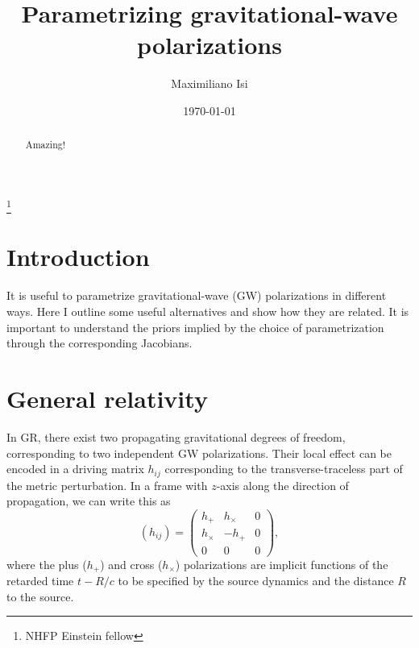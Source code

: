 \documentclass[aps,prd,twocolumn,superscriptaddress,preprintnumbers,floatfix,nofootinbib]{revtex4-2}
\newcommand{\beq}{\begin{equation}}
\newcommand{\eeq}{\end{equation}}
\newcommand{\dcc}{LIGO-PXXXXXXX}
\begin{document}

\title{Parametrizing gravitational-wave polarizations}

\author{Maximiliano Isi}
\thanks{NHFP Einstein fellow}
%


\date{\today}

\begin{abstract}
Amazing!
\end{abstract}

\maketitle


\section{Introduction}
\label{sec:intro}

It is useful to parametrize gravitational-wave (GW) polarizations in different ways.
Here I outline some useful alternatives and show how they are related.
It is important to understand the priors implied by the choice of parametrization through the corresponding Jacobians.

\section{General relativity}

In GR, there exist two propagating gravitational degrees of freedom, corresponding to two independent GW polarizations.
Their local effect can be encoded in a driving matrix $h_{ij}$ corresponding to the transverse-traceless part of the metric perturbation.
In a frame with $z$-axis along the direction of propagation, we can write this as
\beq \label{eq:hij}
(h_{ij}) = \begin{pmatrix}
h_+ & h_\times  & 0 \\
h_\times  & - h_+ & 0  \\
0 & 0 & 0
\end{pmatrix} ,
\eeq
where the plus ($h_+$) and cross ($h_\times$) polarizations are implicit functions of the retarded time $t - R/c$ to be specified by the source dynamics and the distance $R$ to the source.
\end{document}
